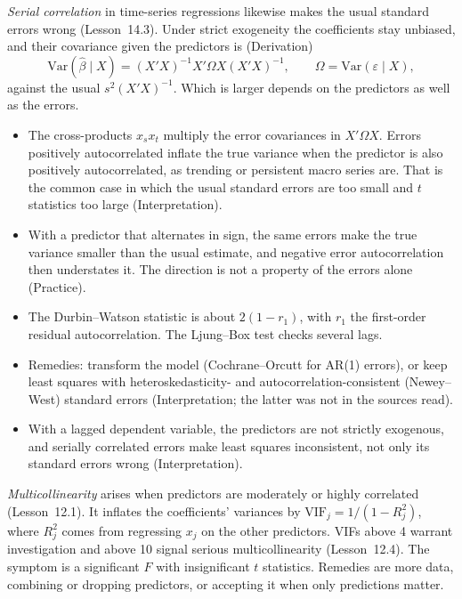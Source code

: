 \begin{qfmethod}
\emph{Serial correlation} in time-series regressions likewise makes the usual standard errors wrong (Lesson~14.3). Under strict exogeneity the coefficients stay unbiased, and their covariance given the predictors is (Derivation)
\[ \mathrm{Var}(\hat\beta\mid X)=(X'X)^{-1}X'\Omega X(X'X)^{-1},\qquad \Omega=\mathrm{Var}(\varepsilon\mid X), \]
against the usual $s^2(X'X)^{-1}$. Which is larger depends on the predictors as well as the errors.
\begin{itemize}
\item The cross-products $x_s x_t$ multiply the error covariances in $X'\Omega X$. Errors positively autocorrelated inflate the true variance when the predictor is also positively autocorrelated, as trending or persistent macro series are. That is the common case in which the usual standard errors are too small and $t$ statistics too large (Interpretation).
\item With a predictor that alternates in sign, the same errors make the true variance smaller than the usual estimate, and negative error autocorrelation then understates it. The direction is not a property of the errors alone (Practice).
\item The Durbin--Watson statistic is about $2(1-r_1)$, with $r_1$ the first-order residual autocorrelation. The Ljung--Box test checks several lags.
\item Remedies: transform the model (Cochrane--Orcutt for AR(1) errors), or keep least squares with heteroskedasticity- and autocorrelation-consistent (Newey--West) standard errors (Interpretation; the latter was not in the sources read).
\item With a lagged dependent variable, the predictors are not strictly exogenous, and serially correlated errors make least squares inconsistent, not only its standard errors wrong (Interpretation).
\end{itemize}

\emph{Multicollinearity} arises when predictors are moderately or highly correlated (Lesson~12.1). It inflates the coefficients' variances by $\mathrm{VIF}_j=1/(1-R_j^2)$, where $R_j^2$ comes from regressing $x_j$ on the other predictors. VIFs above 4 warrant investigation and above 10 signal serious multicollinearity (Lesson~12.4). The symptom is a significant $F$ with insignificant $t$ statistics. Remedies are more data, combining or dropping predictors, or accepting it when only predictions matter.


\end{qfmethod}
